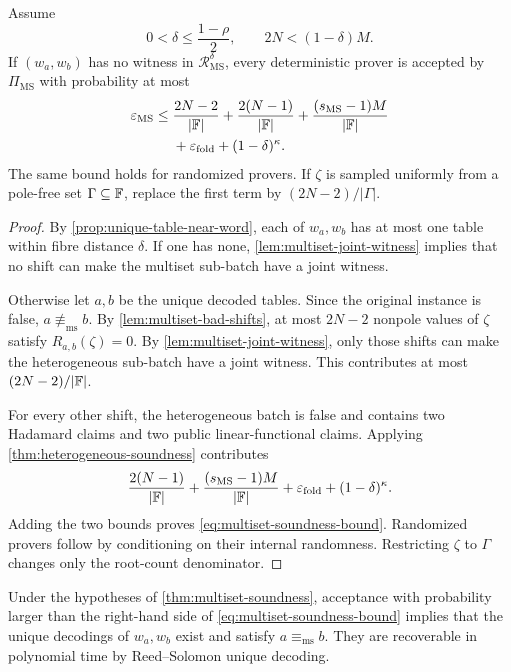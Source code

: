 \begin{theorem}
\label{thm:multiset-soundness}
Assume
\begin{equation}
  0<\delta\le\frac{1-\rho}{2},
  \qquad
  2N<(1-\delta)M.
  \label{eq:multiset-parameters}
\end{equation}
If $(w_a,w_b)$ has no witness in $\mathcal R^{\delta}_{\mathrm{MS}}$, every deterministic prover is accepted by $\Pi_{\mathrm{MS}}$ with probability at most
\begin{equation}
\begin{split}
  \varepsilon_{\mathrm{MS}}
  \le{}&
  \frac{2N-2}{|\mathbb{F}|}
  +\frac{2(N-1)}{|\mathbb{F}|}
  +\frac{(s_{\mathrm{MS}}-1)M}{|\mathbb{F}|}
  \\
  &+\varepsilon_{\mathrm{fold}}
  +(1-\delta)^\kappa.
\end{split}
\label{eq:multiset-soundness-bound}
\end{equation}
The same bound holds for randomized provers.  If $\zeta$ is sampled uniformly from a pole-free set $\Gamma\subseteq\mathbb{F}$, replace the first term by $(2N-2)/|\Gamma|$.
\end{theorem}

\begin{proof}
By \cref{prop:unique-table-near-word}, each of $w_a,w_b$ has at most one table within fibre distance $\delta$.  If one has none, \cref{lem:multiset-joint-witness} implies that no shift can make the multiset sub-batch have a joint witness.

Otherwise let $a,b$ be the unique decoded tables.  Since the original instance is false, $a\not\equiv_{\mathrm{ms}}b$.  By \cref{lem:multiset-bad-shifts}, at most $2N-2$ nonpole values of $\zeta$ satisfy $R_{a,b}(\zeta)=0$.  By \cref{lem:multiset-joint-witness}, only those shifts can make the heterogeneous sub-batch have a joint witness.  This contributes at most $(2N-2)/|\mathbb{F}|$.

For every other shift, the heterogeneous batch is false and contains two Hadamard claims and two public linear-functional claims.  Applying \cref{thm:heterogeneous-soundness} contributes
\[
  \frac{2(N-1)}{|\mathbb{F}|}
  +\frac{(s_{\mathrm{MS}}-1)M}{|\mathbb{F}|}
  +\varepsilon_{\mathrm{fold}}
  +(1-\delta)^\kappa.
\]
Adding the two bounds proves \eqref{eq:multiset-soundness-bound}.  Randomized provers follow by conditioning on their internal randomness.  Restricting $\zeta$ to $\Gamma$ changes only the root-count denominator.
\end{proof}

\begin{corollary}
\label{cor:multiset-knowledge}
Under the hypotheses of \cref{thm:multiset-soundness}, acceptance with probability larger than the right-hand side of \eqref{eq:multiset-soundness-bound} implies that the unique decodings of $w_a,w_b$ exist and satisfy $a\equiv_{\mathrm{ms}}b$.  They are recoverable in polynomial time by Reed--Solomon unique decoding.
\end{corollary}

